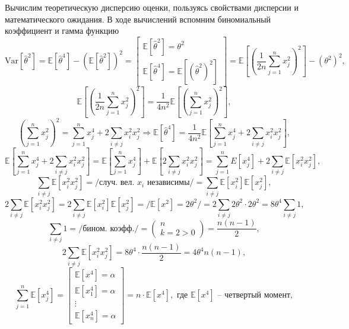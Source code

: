 \documentclass[a4paper, 12pt]{article}
\begin{document}
    Вычислим теоретическую дисперсию оценки, пользуясь свойствами дисперсии и математического ожидания. В ходе вычислений вспомним биномиальный коэффициент и гамма функцию
    $$\text{Var}{\left[\hat{\theta}^2\right]}=\mathbb{E}\left[\hat{\theta}^4\right]-\left(\mathbb{E}\left[\hat{\theta}^2\right]\right)^2
    =\begin{bmatrix}
        \mathbb{E}\left[\hat{\theta}^2\right]=\theta^2\\
        \mathbb{E}\left[\hat{\theta}^4\right]=\mathbb{E}\left[\left(\hat{\theta}^2\right)^2\right]
    \end{bmatrix}
    =\mathbb{E}\left[\left(\dfrac{1}{2n}\sum\limits_{j=1}^{n}x_j^2\right)^2\right]-\left(\theta^2\right)^2,$$
    $$\mathbb{E}\left[\left(\dfrac{1}{2n}\sum\limits_{j=1}^{n}x_j^2\right)^2\right]=\dfrac{1}{4n^2}\mathbb{E}\left[\left(\sum\limits_{j=1}^{n}x_j^2\right)^2\right],$$
    $$\left(\sum\limits_{j=1}^{n}x_j^2\right)^2=\sum\limits_{j=1}^{n}x_j^4+2\sum\limits_{i\neq j}x_i^2x_j^2\Rightarrow \mathbb{E}\left[\hat{\theta}^4\right]=\dfrac{1}{4n^2}\mathbb{E}\left[\sum\limits_{j=1}^{n}x_j^4+2\sum\limits_{i\neq j}x_i^2x_j^2\right],$$
    $$\mathbb{E}\left[\sum\limits_{j=1}^{n}x_j^4+2\sum\limits_{i\neq j}x_i^2x_j^2\right]=\mathbb{E}\left[\sum\limits_{j=1}^{n}x_j^4\right]+\mathbb{E}\left[2\sum\limits_{i\neq{j}}x_i^2x_j^2\right]=
    \sum\limits_{j=1}^{n}E\left[x_j^4\right]+2\sum\limits_{i\neq{j}}\mathbb{E}\left[x_i^2x_j^2\right],$$
    $$\sum\limits_{i\neq{j}}\mathbb{E}\left[x_i^2x_j^2\right]=/\text{случ. вел. }x_i \text{ независимы}/=\sum\limits_{i\neq{j}}\mathbb{E}\left[x_i^2\right]\mathbb{E}\left[x_j^2\right],$$
    $$2\sum\limits_{i\neq{j}}\mathbb{E}\left[x_i^2x_j^2\right]=2\sum\limits_{i\neq{j}}\mathbb{E}\left[x_i^2\right]\mathbb{E}\left[x_j^2\right]=/\mathbb{E}\left[x^2\right]=2\theta^2/=2\sum\limits_{i\neq{j}}2\theta^2\cdot2\theta^2=8\theta^4\sum\limits_{i\neq{j}}1,$$
    $$\sum\limits_{i\neq{j}}1=
    /\text{бином. коэфф.}/=
    \begin{pmatrix}
        n\\
        k=2>0
    \end{pmatrix}
    =\dfrac{n\left(n-1\right)}{2},$$
    $$2\sum\limits_{i\neq{j}}\mathbb{E}\left[x_i^2x_j^2\right]=8\theta^4\cdot\dfrac{n\left(n-1\right)}{2}=4\theta^4n\left(n-1\right),$$
    $$\sum\limits_{j=1}^{n}\mathbb{E}\left[x_j^4\right]=
    \begin{bmatrix}
        \mathbb{E}\left[x^4\right]=\alpha\\
        \mathbb{E}\left[x_1^4\right]=\alpha\\
        \vdots \\
        \mathbb{E}\left[x_n^4\right]=\alpha
    \end{bmatrix}=
    n\cdot\mathbb{E}\left[x^4\right],\text{ где }\mathbb{E}\left[x^4\right]\text{ -- четвертый момент},$$
\end{document}
